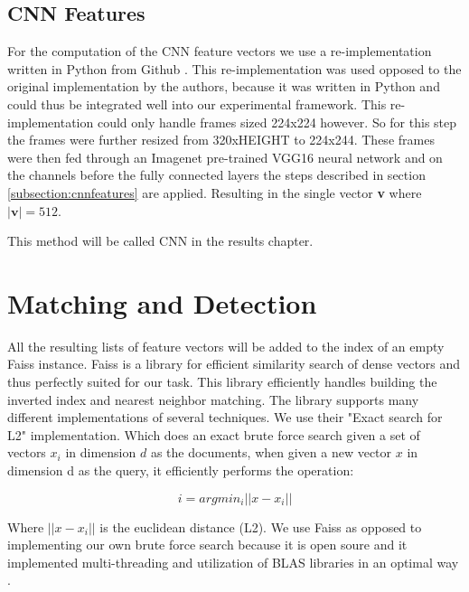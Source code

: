 \documentclass{report}
\begin{document}
\subsection{CNN Features}
For the computation of the CNN feature vectors we use a re-implementation written in Python from Github \cite{rmac-github}. This re-implementation was used opposed to the original implementation by the authors, because it was written in Python and could thus be integrated well into our experimental framework. This re-implementation could only handle frames sized 224x224 however. So for this step the frames were further resized from 320xHEIGHT to 224x244. These frames were then fed through an Imagenet pre-trained VGG16 neural network and on the channels before the fully connected layers the steps described in section \ref{subsection:cnnfeatures} are applied. Resulting in the single vector \textbf{v} where $|\textbf{v}| = 512$.

This method will be called CNN in the results chapter.


\section{Matching and Detection}

All the resulting lists of feature vectors will be added to the index of an empty Faiss instance. Faiss is a library for efficient similarity search of dense vectors \cite{faiss, faiss-github} and thus perfectly suited for our task. This library efficiently handles building the inverted index and nearest neighbor matching. The library supports many different implementations of several techniques. We use their "Exact search for L2" implementation. Which does an exact brute force search given a set of vectors $x_i$ in dimension $d$ as the documents, when given a new vector $x$ in dimension d as the query, it efficiently performs the operation:

\[i = argmin_i||x - x_i||\]

\noindent Where $||x - x_i||$ is the euclidean distance (L2). We use Faiss as opposed to implementing our own brute force search because it is open soure and it implemented multi-threading and utilization of BLAS libraries in an optimal way \cite{faiss-blog}.
\\
\end{document}
